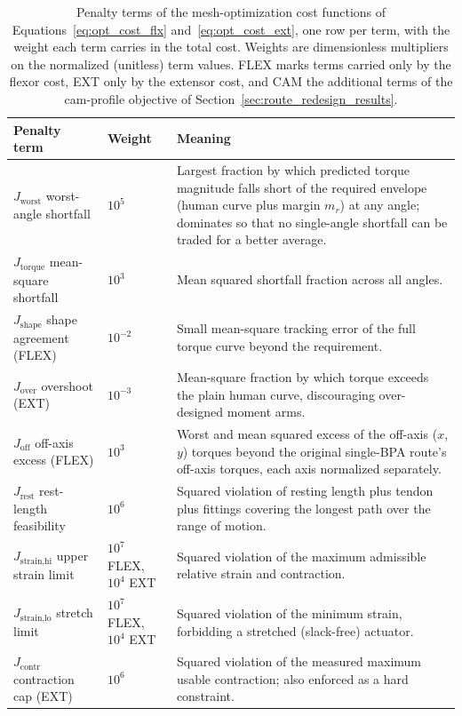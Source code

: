 \begin{table}[htbp]
\centering
\caption{Penalty terms of the mesh-optimization cost functions of Equations~\eqref{eq:opt_cost_flx} and~\eqref{eq:opt_cost_ext}, one row per term, with the weight each term carries in the total cost. Weights are dimensionless multipliers on the normalized (unitless) term values. FLEX marks terms carried only by the flexor cost, EXT only by the extensor cost, and CAM the additional terms of the cam-profile objective of Section~\ref{sec:route_redesign_results}.}
\label{tab:mesh_penalties}
\small
\begin{tabular}{@{}llp{8.2cm}@{}}
\toprule
\textbf{Penalty term} & \textbf{Weight} & \textbf{Meaning} \\
\midrule
$J_{\text{worst}}$ worst-angle shortfall & $10^{5}$ & Largest fraction by which predicted torque magnitude falls short of the required envelope (human curve plus margin $m_{r}$) at any angle; dominates so that no single-angle shortfall can be traded for a better average. \\
$J_{\text{torque}}$ mean-square shortfall & $10^{3}$ & Mean squared shortfall fraction across all angles. \\
$J_{\text{shape}}$ shape agreement (FLEX) & $10^{-2}$ & Small mean-square tracking error of the full torque curve beyond the requirement. \\
$J_{\text{over}}$ overshoot (EXT) & $10^{-3}$ & Mean-square fraction by which torque exceeds the plain human curve, discouraging over-designed moment arms. \\
$J_{\text{off}}$ off-axis excess (FLEX) & $10^{3}$ & Worst and mean squared excess of the off-axis ($x$, $y$) torques beyond the original single-BPA route's off-axis torques, each axis normalized separately. \\
$J_{\text{rest}}$ rest-length feasibility & $10^{6}$ & Squared violation of resting length plus tendon plus fittings covering the longest path over the range of motion. \\
$J_{\text{strain,hi}}$ upper strain limit & $10^{7}$ FLEX, $10^{4}$ EXT & Squared violation of the maximum admissible relative strain and contraction. \\
$J_{\text{strain,lo}}$ stretch limit & $10^{7}$ FLEX, $10^{4}$ EXT & Squared violation of the minimum strain, forbidding a stretched (slack-free) actuator. \\
$J_{\text{contr}}$ contraction cap (EXT) & $10^{6}$ & Squared violation of the measured maximum usable contraction; also enforced as a hard constraint. \\

\end{tabular}
\end{table}
